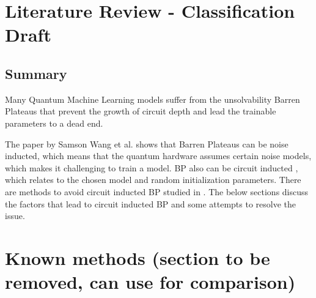 \section{Literature Review - Classification Draft}

\subsection{Summary}

Many Quantum Machine Learning models suffer from the unsolvability Barren Plateaus \cite{zhaoReviewQuantumNeural2021} that prevent the growth of circuit depth and lead the trainable parameters to a dead end.

The paper \cite{wangNoiseinducedBarrenPlateaus2021} by Samson Wang et al. shows that Barren Plateaus can be noise inducted, which means that the quantum hardware assumes certain noise models, which makes it challenging to train a model. 
BP also can be circuit inducted \cite{mccleanBarrenPlateausQuantum2018}, which relates to the chosen model and random initialization parameters.
There are methods to avoid circuit inducted BP studied in \cite{pesahAbsenceBarrenPlateaus2021, cerezoCostFunctionDependent2021,skolikLayerwiseLearningQuantum2021}.
The below sections discuss the factors that lead to circuit inducted BP and some attempts to resolve the issue.







\vspace{60pt}
\section{Known methods (section to be removed, can use for comparison)}





